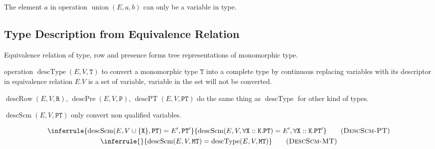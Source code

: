 \documentclass{report}
\newcommand{\code}{\mathtt}
\newcommand{\ruleTag}[1]{\label{#1}\tag{\textsc{#1}}}
\DeclareMathOperator{\union}{union}
\DeclareMathOperator{\describeScheme}{descScm}
\DeclareMathOperator{\describeType}{descType}
\DeclareMathOperator{\describeRow}{descRow}
\DeclareMathOperator{\describePresence}{descPre}
\DeclareMathOperator{\describePresenceWithType}{descPT}
\begin{document}
The element \(a\) in operation \(\union(E, a, b)\) can only be a variable in type.

\subsection{Type Description from Equivalence Relation}

Equivalence relation of type, row and presence forms tree representations of monomorphic type.

operation \(\describeType(E, V, \code{T})\) to convert a monomorphic type \(\code{T}\) into a complete type by continuous replacing variables with its descriptor in equivalence relation \(E\).\(V\) is a set of variable, variable in the set will not be converted.

\(\describeRow(E, V, \code{R})\), \(\describePresence(E, V, \code{P})\), \(\describePresenceWithType(E, V, \code{PT})\) do the same thing as \(\describeType\) for other kind of types.

\(\describeScheme(E, V, \code{PT})\) only convert non qualified variables.

\begin{gather}
\inferrule
{\describeScheme(E, V \cup \{\code{X}\}, \code{PT}) = E', \code{PT}'}
{\describeScheme(E, V, \forall \code{X} :: \code{K} . \code{PT}) = E', \forall \code{X} :: \code{K} . \code{PT}'}
\ruleTag{DescScm-PT}
\\
\inferrule
{}
{\describeScheme(E, V, \code{MT}) = \describeType(E, V, \code{MT})}
\ruleTag{DescScm-MT}
\end{gather}
\end{document}
